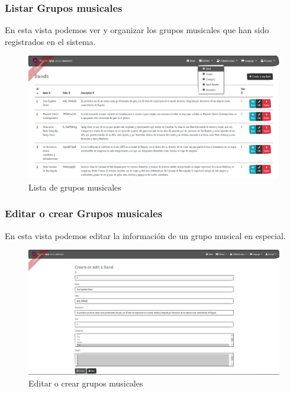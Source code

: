 \subsubsection{Listar Grupos musicales}
En esta vista podemos ver y organizar los grupos musicales que han sido registrados en el sistema.
\begin{figure}[h!]
 \centering
\includegraphics[width=\linewidth]{Desarrollo/Interfaces/Interfaces/imgs/BandList.PNG}
\caption{Lista de grupos musicales}
\end{figure}

\newpage

\subsubsection{Editar o crear Grupos musicales}
En esta vista podemos editar la información de un grupo musical en especial.
\begin{figure}[h!]
 \centering
\includegraphics[width=\linewidth]{Desarrollo/Interfaces/Interfaces/imgs/BandEdit.PNG}
\caption{Editar o crear grupos musicales}
\end{figure}

\newpage

